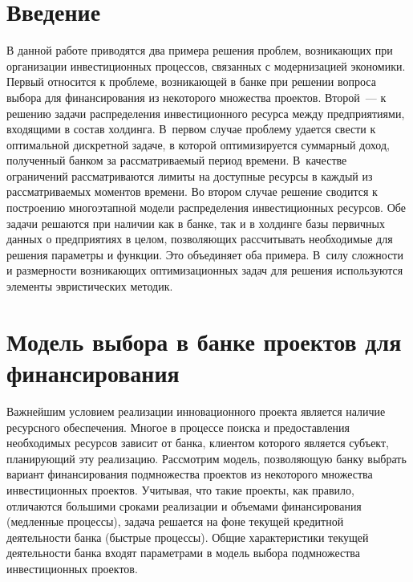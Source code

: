      \begin{multicols}{2}
      
            \label{st\stat}


\section{Введение}

В данной работе приводятся два примера решения проблем, возникающих 
при организации инвестиционных процессов, связанных с модернизацией 
экономики. Первый относится к проблеме, возникающей в банке при 
решении вопроса выбора для финансирования из некоторого множества 
проектов. Второй~--- к решению задачи распределения инвестиционного 
ресурса между предприятиями, входящими в состав холдинга. В~первом 
случае проблему удается свести к оптимальной дискретной задаче, в которой 
оптимизируется суммарный доход, полученный банком за рассматриваемый 
период времени. В~качестве ограничений рассматриваются лимиты на 
доступные ресурсы в каждый из рассматриваемых моментов времени. Во 
втором случае решение сводится к построению многоэтапной модели 
распределения инвестиционных ресурсов. Обе задачи решаются при наличии 
как в банке, так и в холдинге базы первичных данных о предприятиях в 
целом, позволяющих рассчитывать необходимые для решения параметры и 
функции. Это объединяет оба примера. В~силу сложности и размерности 
возникающих оптимизационных задач для решения используются элементы 
эвристических методик.

\section{Модель выбора в банке проектов для финансирования}
     
     Важнейшим условием реализации инновационного проекта является 
наличие ресурсного обеспечения. Многое в процессе поиска и 
предоставления необходимых ресурсов зависит от банка, клиентом которого 
является субъект, планирующий эту реализацию. Рассмотрим модель, 
позволяющую банку выбрать вариант финансирования подмножества 
проектов из некоторого множества ин\-вес\-ти\-ци\-он\-ных проектов. Учитывая, что 
такие проекты, как правило, отличаются большими сроками реализации и 
объемами финансирования (медленные процессы), задача решается на фоне 
текущей кредитной деятельности банка (быстрые процессы). Общие 
характеристики текущей деятельности банка входят параметрами в модель 
выбора подмножества инвестиционных проектов.


\end{multicols}
